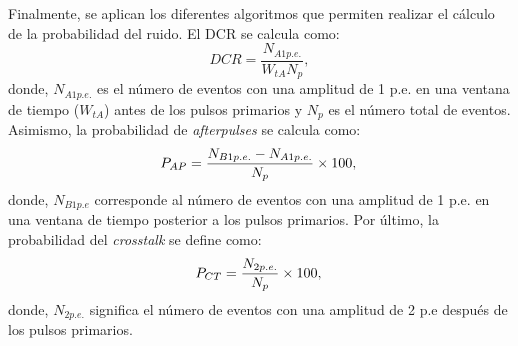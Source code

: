 \\ \\
Finalmente, se aplican los diferentes algoritmos que permiten realizar el cálculo de la probabilidad del ruido. El DCR se calcula como:
\begin{equation}
    DCR = \frac{N_{A1p.e.}}{W_{tA}N_p},
    \label{DCR_eq}
\end{equation}
donde, $N_{A1p.e.}$ es el número de eventos con una amplitud de 1 p.e. en una ventana de tiempo ($W_{tA}$) antes de los pulsos primarios y $N_p$ es el número total de eventos. Asimismo, la probabilidad de \textit{afterpulses} se calcula como:
\begin{equation}
    P_{AP} = \frac{N_{B1p.e.}-N_{A1p.e.}}{N_p}\times 100,\\
    \label{AP_eq}
\end{equation}
donde, $N_{B1p.e}$ corresponde al número de eventos con una amplitud de 1 p.e. en una ventana de tiempo posterior a los pulsos primarios.
Por último, la probabilidad del \textit{crosstalk} se define como:
\begin{equation}
    P_{CT} =\frac{N_{2p.e.}}{N_p}\times 100,\\
    \label{CT_eq}
\end{equation}
donde, $N_{2p.e.}$ significa el número de eventos con una amplitud de 2 p.e después de los pulsos primarios.\\ 
